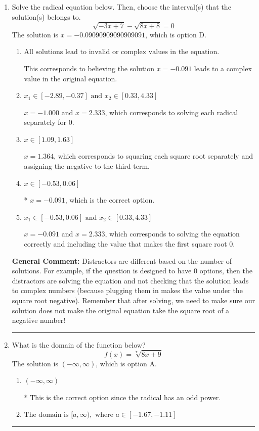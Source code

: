 \documentclass{extbook}[14pt]
\newcommand{\litem}[1]{\item #1

\rule{\textwidth}{0.4pt}}
\begin{document}
\begin{enumerate}\litem{
Solve the radical equation below. Then, choose the interval(s) that the solution(s) belongs to.
\[ \sqrt{-3 x + 7} - \sqrt{8 x + 8} = 0 \]The solution is \( x = -0.09090909090909091 \), which is option D.\begin{enumerate}[label=\Alph*.]
\item \( \text{All solutions lead to invalid or complex values in the equation.} \)

This corresponds to believing the solution $x = -0.091$ leads to a complex value in the original equation.
\item \( x_1 \in [-2.89, -0.37] \text{ and } x_2 \in [0.33,4.33] \)

$x = -1.000$ and $x = 2.333$, which corresponds to solving each radical separately for 0.
\item \( x \in [1.09,1.63] \)

$x = 1.364$, which corresponds to squaring each square root separately and assigning the negative to the third term.
\item \( x \in [-0.53,0.06] \)

* $x = -0.091$, which is the correct option.
\item \( x_1 \in [-0.53, 0.06] \text{ and } x_2 \in [0.33,4.33] \)

$x = -0.091$ and $x = 2.333$, which corresponds to solving the equation correctly and including the value that makes the first square root 0.
\end{enumerate}

\textbf{General Comment:} Distractors are different based on the number of solutions. For example, if the question is designed to have 0 options, then the distractors are solving the equation and not checking that the solution leads to complex numbers (because plugging them in makes the value under the square root negative). Remember that after solving, we need to make sure our solution does not make the original equation take the square root of a negative number!
}
\litem{
What is the domain of the function below?
\[ f(x) = \sqrt[7]{8 x + 9} \]The solution is \( (-\infty, \infty) \), which is option A.\begin{enumerate}[label=\Alph*.]
\item \( (-\infty, \infty) \)

* This is the correct option since the radical has an odd power.
\item \( \text{The domain is } [a, \infty), \text{   where } a \in [-1.67, -1.11] \)


\end{enumerate}}
\end{enumerate}
\end{document}
